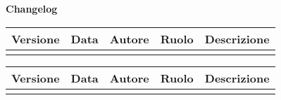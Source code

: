 \newpage

\begin{center}
	\Large{\textbf{Changelog}}
	\\\vspace{0.5cm}
	\normalsize
		\begin{tabularx}{\textwidth}{ccccX}
		\textbf{Versione} & \textbf{Data} & \textbf{Autore} & \textbf{Ruolo} &\textbf{Descrizione}\\\toprule
		\modificheuno
		\bottomrule
	\end{tabularx}
	\newpage
	\begin{tabularx}{\textwidth}{ccccX}
		\textbf{Versione} & \textbf{Data} & \textbf{Autore} & \textbf{Ruolo} &\textbf{Descrizione} \\\toprule
		\modifichedue
		\bottomrule
	\end{tabularx}
\end{center}
